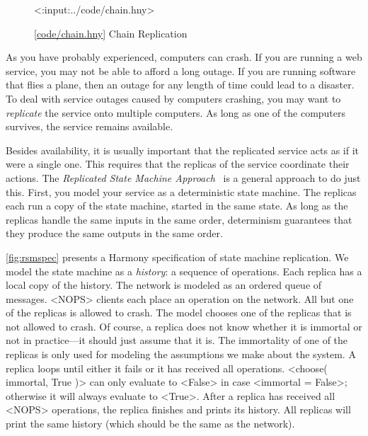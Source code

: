 \documentclass{report}
\newcommand{\harmonylink}[1]{%
[\href{https://harmony.cs.cornell.edu/#1}{\underline{#1}}]%
}
\newenvironment{code}{
\tcolorbox
}{
\endtcolorbox
}
\begin{document}
\begin{figure}
\begin{code}
<{:input:../code/chain.hny}>
\end{code}
\caption{\harmonylink{code/chain.hny} Chain Replication}
\label{fig:chain}
\end{figure}

%
%
As you have probably experienced, computers can crash.
If you are running a web service, you may not be able to afford
a long outage.  If you are running software that flies a plane,
then an outage for any length of time could lead to a disaster.
To deal with service outages caused by computers crashing, you may want
to \emph{replicate} the service onto multiple computers.  As long as
one of the computers survives, the service remains available.

%
%
%
Besides availability, it is usually important that the replicated
service acts as if it were a single one.  This requires that the
replicas of the service coordinate their actions.
The \emph{Replicated State Machine Approach}~\cite{Lam78,S90} is a
general approach to do just this.
First, you model your service as a deterministic state
machine.  The replicas each run a copy of the state machine, started
in the same state.  As long as the replicas handle the same inputs
in the same order, determinism guarantees that they produce the same
outputs in the same order.

\autoref{fig:rsmspec} presents a Harmony specification of state machine
replication.
We model the state machine as a \emph{history}: a sequence of operations.
Each replica has a local copy of the history.
The network is modeled as an ordered queue of messages.
<{NOPS}> clients each place an operation on the network.
All but one of the replicas is allowed to crash.
The model chooses one of the replicas that is not allowed to crash.
Of course, a replica does not know whether it is immortal
or not in practice---it should just assume that it is.
The immortality of one of the replicas is only used for modeling
the assumptions we make about the system.
A replica loops until either it fails or it has received all operations.
<{choose({ immortal, True })}> can only
evaluate to <{False}> in case <{immortal = False}>; otherwise
it will always evaluate to <{True}>.
After a replica has received all <{NOPS}> operations, the replica
finishes and prints its history.
All replicas will print the same history (which should be the same
as the network).
\end{document}
